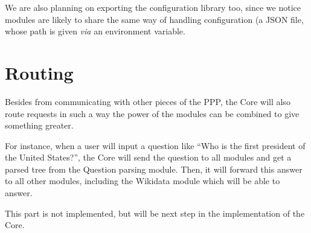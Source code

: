 We are also planning on exporting the configuration
library too, since we notice modules are likely to share the
same way of handling configuration (a JSON file, whose path
is given {\em via} an environment variable.

\section{Routing}

Besides from communicating with other pieces of the PPP, the Core will
also route requests in such a way the power of the modules can be
combined to give something greater.

For instance, when a user will input a question like “Who is the first
president of the United States?”, the Core will send the question to
all modules and get a parsed tree from the Question parsing module. Then, it will forward this answer to all other modules,
including the Wikidata module which will be able to answer.

This part is not implemented, but will be next step in the implementation
of the Core.
